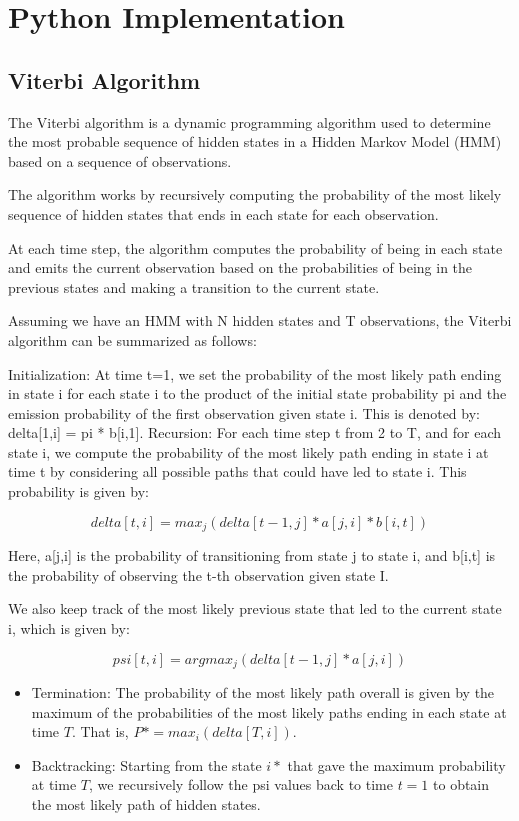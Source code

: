 \section{Python Implementation}
\label{sec:hmm_python}

\subsection{Viterbi Algorithm}
The Viterbi algorithm is a dynamic programming algorithm used to determine the most probable sequence of hidden states in a Hidden Markov Model (HMM) based on a sequence of observations. 

The algorithm works by recursively computing the probability of the most likely sequence of hidden states that ends in each state for each observation.

At each time step, the algorithm computes the probability of being in each state and emits the current observation based on the probabilities of being in the previous states and making a transition to the current state.

Assuming we have an HMM with N hidden states and T observations, the Viterbi algorithm can be summarized as follows:

    Initialization: At time t=1, we set the probability of the most likely path ending in state i for each state i to the product of the initial state probability pi and the emission probability of the first observation given state i. This is denoted by: delta[1,i] = pi * b[i,1].
    Recursion: For each time step t from 2 to T, and for each state i, we compute the probability of the most likely path ending in state i at time t by considering all possible paths that could have led to state i. This probability is given by:

$$delta[t,i] = max_j(delta[t-1,j] * a[j,i] * b[i,t])$$

Here, a[j,i] is the probability of transitioning from state j to state i, and b[i,t] is the probability of observing the t-th observation given state I.

We also keep track of the most likely previous state that led to the current state i, which is given by:

$$psi[t,i] = argmax_j(delta[t-1,j] * a[j,i])$$

\begin{itemize}
	\item Termination: The probability of the most likely path overall is given by the maximum of the probabilities of the most likely paths ending in each state at time $T$. That is, $P* = max_i(delta[T,i])$.
	\item Backtracking: Starting from the state $i*$ that gave the maximum probability at time $T$, we recursively follow the psi values back to time $t=1$ to obtain the most likely path of hidden states.
\end{itemize}


